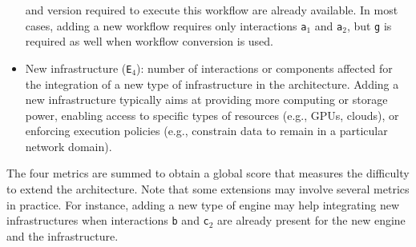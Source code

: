 \documentclass[preprint,3p,twocolumn]{elsarticle}
\newcommand{\todo}[2]{\pdfmargincomment[color=red,author=#1,open=true]{#2}}
\begin{document}
\begin{itemize}[leftmargin=0cm,itemindent=0.35cm,itemsep=0cm]
  and version required to execute this workflow are already
  available. In most cases, adding a new workflow requires only
  interactions \texttt{a$_1$} and \texttt{a$_2$}, but \texttt{g}
  is required as well when workflow conversion is used. 
\item New infrastructure (\texttt{E$_4$}): number of interactions or
  components affected for the integration of a new type of infrastructure in
  the architecture. Adding a new infrastructure typically aims at providing more
  computing or storage power, enabling access to specific types of resources
  (e.g., GPUs, clouds), or  enforcing execution policies (e.g.,
  constrain data to remain in a particular network domain).
\end{itemize}
The four metrics are summed to obtain a global score that measures the
difficulty to extend the architecture. Note that some extensions may
involve several metrics in practice. For instance, adding a new type
of engine may help integrating new infrastructures when interactions
\texttt{b} and \texttt{c$_2$} are already present for the new engine
and the infrastructure.
\end{document}
